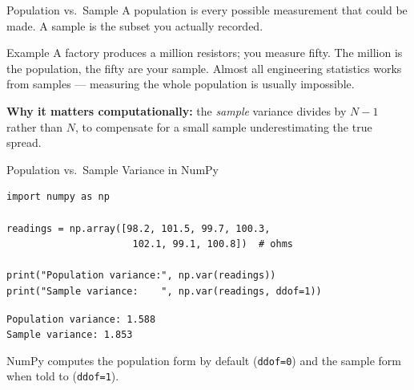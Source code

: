\documentclass[9pt,aspectratio=169,xcolor=table]{beamer}
\begin{document}
\begin{frame}{Population vs.\ Sample}
    \leavevmode
    A \alert{population} is every possible measurement that could be
    made. A \alert{sample} is the subset you actually recorded.

    \vspace{2mm}
    \begin{block}{Example}
        A factory produces a million resistors; you measure fifty.
        The million is the population, the fifty are your sample.
        Almost all engineering statistics works from samples --- measuring
        the whole population is usually impossible.
    \end{block}

    \vspace{2mm}
    \textbf{Why it matters computationally:} the \emph{sample} variance
    divides by $N-1$ rather than $N$, to compensate for a small sample
    underestimating the true spread.
\end{frame}

\begin{frame}[fragile]{Population vs.\ Sample Variance in NumPy}
    \leavevmode
\begin{lstlisting}
import numpy as np

readings = np.array([98.2, 101.5, 99.7, 100.3,
                      102.1, 99.1, 100.8])  # ohms

print("Population variance:", np.var(readings))
print("Sample variance:    ", np.var(readings, ddof=1))
\end{lstlisting}
    \texttt{Population variance: 1.588} \\
    \texttt{Sample variance:     1.853}

    \vspace{2mm}
    {\small NumPy computes the population form by default
    (\texttt{ddof=0}) and the sample form when told to
    (\texttt{ddof=1}).}
\end{frame}
\end{document}
